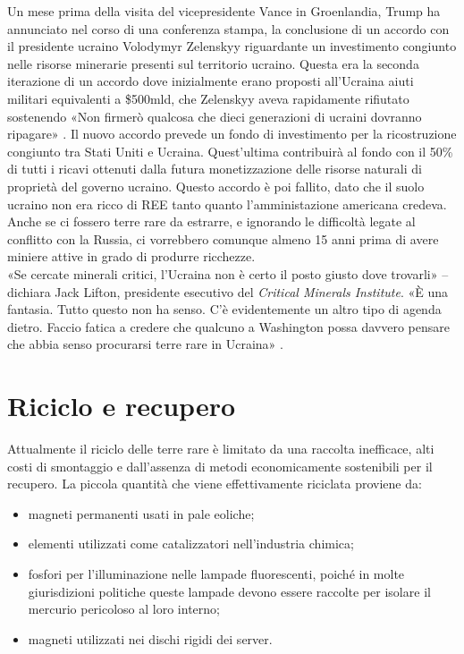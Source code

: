 \documentclass[12pt,a4paper,oneside]{book}
\begin{document}
Un mese prima della visita del vicepresidente Vance in Groenlandia, Trump ha annunciato nel corso di una conferenza stampa, la conclusione di un accordo con il presidente ucraino Volodymyr Zelenskyy riguardante un investimento congiunto nelle risorse minerarie presenti sul territorio ucraino. Questa era la seconda iterazione di un accordo dove inizialmente erano proposti all'Ucraina aiuti militari equivalenti a \$500mld, che Zelenskyy aveva rapidamente rifiutato sostenendo «Non firmerò qualcosa che dieci generazioni di ucraini dovranno ripagare» \cite{guardian2025trumpdeal}.
Il nuovo accordo prevede un fondo di investimento per la ricostruzione congiunto tra Stati Uniti e Ucraina. Quest'ultima contribuirà al fondo con il 50\% di tutti i ricavi ottenuti dalla futura monetizzazione delle risorse naturali di proprietà del governo ucraino.
Questo accordo è poi fallito, dato che il suolo ucraino non era ricco di REE tanto quanto l'amministazione americana credeva. Anche se ci fossero terre rare da estrarre, e ignorando le difficoltà legate al conflitto con la Russia, ci vorrebbero comunque almeno 15 anni prima di avere miniere attive in grado di produrre ricchezze.\\
«Se cercate minerali critici, l'Ucraina non è certo il posto giusto dove trovarli» – dichiara Jack Lifton, presidente esecutivo del \textit{Critical Minerals Institute}. «È una fantasia. Tutto questo non ha senso. C'è evidentemente un altro tipo di agenda dietro. Faccio fatica a credere che qualcuno a Washington possa davvero pensare che abbia senso procurarsi terre rare in Ucraina» \cite{ieee2023ukraine}.

\section{Riciclo e recupero}
Attualmente il riciclo delle terre rare è limitato da una raccolta inefficace, alti costi di smontaggio e dall’assenza di metodi economicamente sostenibili per il recupero.
La piccola quantità che viene effettivamente riciclata proviene da:
\begin{itemize}
    \item magneti permanenti usati in pale eoliche;
    \item elementi utilizzati come catalizzatori nell'industria chimica;
    \item fosfori per l'illuminazione nelle lampade fluorescenti, poiché in molte giurisdizioni politiche queste lampade devono essere raccolte per isolare il mercurio pericoloso al loro interno;
    \item magneti utilizzati nei dischi rigidi dei server.
\end{itemize}
\end{document}
